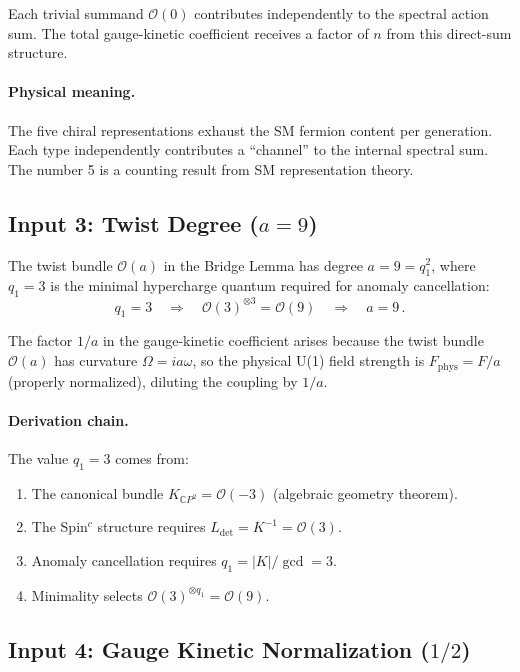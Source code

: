 \documentclass[12pt,a4paper]{article}
\theoremstyle{definition}
\begin{document}
Each trivial summand $\mathcal{O}(0)$ contributes independently to the
spectral action sum.  The total gauge-kinetic coefficient receives a
factor of $n$ from this direct-sum structure.

\paragraph{Physical meaning.} The five chiral representations exhaust
the SM fermion content per generation.  Each type independently
contributes a ``channel'' to the internal spectral sum.  The number 5
is a counting result from SM representation theory.

\subsection{Input 3: Twist Degree ($a = 9$)}
\label{sec:a}

The twist bundle $\mathcal{O}(a)$ in the Bridge Lemma has degree
$a = 9 = q_1^2$, where $q_1 = 3$ is the minimal hypercharge quantum
required for anomaly cancellation:
\begin{equation}
q_1 = 3 \quad\Longrightarrow\quad
\mathcal{O}(3)^{\otimes 3} = \mathcal{O}(9)
\quad\Longrightarrow\quad a = 9\,.
\end{equation}

The factor $1/a$ in the gauge-kinetic coefficient arises because the
twist bundle $\mathcal{O}(a)$ has curvature $\Omega = ia\omega$, so the
physical U(1) field strength is $F_{\mathrm{phys}} = F/a$ (properly
normalized), diluting the coupling by $1/a$.

\paragraph{Derivation chain.} The value $q_1 = 3$ comes from:
\begin{enumerate}
\item The canonical bundle $K_{\mathbb{C}P^2} = \mathcal{O}(-3)$
  (algebraic geometry theorem).
\item The Spin$^c$ structure requires $L_{\mathrm{det}} = K^{-1}
  = \mathcal{O}(3)$.
\item Anomaly cancellation requires $q_1 = |K|/\gcd = 3$.
\item Minimality selects $\mathcal{O}(3)^{\otimes q_1} = \mathcal{O}(9)$.
\end{enumerate}

\subsection{Input 4: Gauge Kinetic Normalization ($1/2$)}
\label{sec:half}
\end{document}
